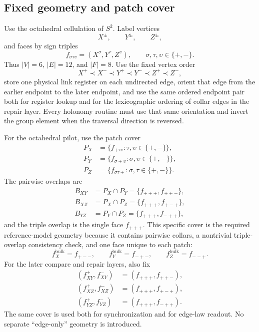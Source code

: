 \documentclass[11pt]{article}
\begin{document}
\subsection{Fixed geometry and patch cover}

Use the octahedral cellulation of $S^2$. Label vertices
\begin{equation}
X^{\pm},\qquad Y^{\pm},\qquad Z^{\pm},
\end{equation}
and faces by sign triples
\begin{equation}
f_{\sigma\tau\upsilon}=(X^{\sigma},Y^{\tau},Z^{\upsilon}),
\qquad \sigma,\tau,\upsilon\in\{+,-\}.
\end{equation}
Thus $|V|=6$, $|E|=12$, and $|F|=8$. Use the fixed vertex order
\begin{equation}
X^+ \prec X^- \prec Y^+ \prec Y^- \prec Z^+ \prec Z^-,
\end{equation}
store one physical link register on each undirected edge, orient that edge from the earlier
endpoint to the later endpoint, and use the same ordered endpoint pair both for register lookup
and for the lexicographic ordering of collar edges in the repair layer. Every holonomy routine
must use that same orientation and invert the group element when the traversal direction is
reversed.

For the octahedral pilot, use the patch cover
\begin{align}
P_X &= \{f_{+\tau\upsilon}:\tau,\upsilon\in\{+,-\}\},\\
P_Y &= \{f_{\sigma+\upsilon}:\sigma,\upsilon\in\{+,-\}\},\\
P_Z &= \{f_{\sigma\tau+}:\sigma,\tau\in\{+,-\}\}.
\end{align}
The pairwise overlaps are
\begin{align}
B_{XY}&=P_X\cap P_Y=\{f_{+++},f_{++-}\},\\
B_{XZ}&=P_X\cap P_Z=\{f_{+++},f_{+-+}\},\\
B_{YZ}&=P_Y\cap P_Z=\{f_{+++},f_{-++}\},
\end{align}
and the triple overlap is the single face $f_{+++}$. This specific cover is the required reference-model
geometry because it contains pairwise collars, a nontrivial triple-overlap consistency
check, and one face unique to each patch:
\begin{equation}
f_X^{\mathrm{bulk}}=f_{+--},
\qquad
f_Y^{\mathrm{bulk}}=f_{-+-},
\qquad
f_Z^{\mathrm{bulk}}=f_{--+}.
\end{equation}
For the later compare and repair layers, also fix
\begin{align}
(f_{XY}^{+},f_{XY}^{-})&=(f_{+++},f_{++-}),\\
(f_{XZ}^{+},f_{XZ}^{-})&=(f_{+++},f_{+-+}),\\
(f_{YZ}^{+},f_{YZ}^{-})&=(f_{+++},f_{-++}).
\end{align}
The same cover is used both for synchronization and for edge-law readout. No separate
``edge-only'' geometry is introduced.
\end{document}
